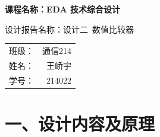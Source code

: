 \documentclass{article}
\newcommand{\fourhao}{\fontsize{14pt}{\baselineskip}\selectfont} %
\newcommand{\xiaosihao}{\fontsize{12pt}{\baselineskip}\selectfont} %
\begin{document}
\begin{titlepage}
    \centering
    \vspace*{2cm}

    \Huge
    \textbf{课程名称：EDA 技术综合设计}

    \vspace{2cm}

    \LARGE
    设计报告名称：设计二\ 数值比较器

    \vspace{4cm}

    \centering
    \Large
    \begin{tabular}{rl}
        班级： & 通信214    \\
        姓名： & \ 王峤宇    \\
        学号： & \ 214022
    \end{tabular}

    \vfill

    \vspace{1cm}
\end{titlepage}

\newpage
\section*{\fourhao 一、设计内容及原理}
\xiaosihao

\end{document}
